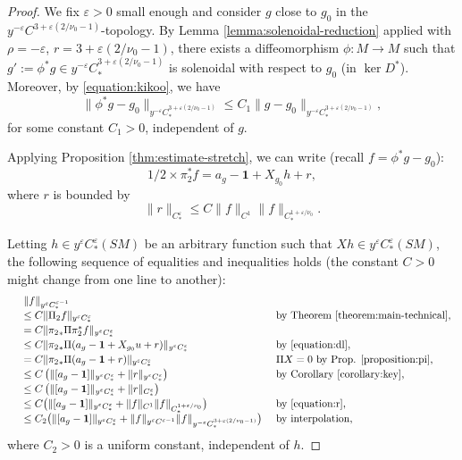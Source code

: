 \documentclass[JEP,XML,SOM,Unicode,NoFloatCountersInSection]{cedram}
\newcommand{\eps}{\varepsilon}
\theoremstyle{plain}
\theoremstyle{definition}
\begin{document}
\begin{proof}
We fix $\eps > 0$ small enough and consider $g$ close to $g_0$ in the $y^{-\eps} C^{3+\eps(2/\nu_0-1)}$-topology. By Lemma \ref{lemma:solenoidal-reduction} applied with $\rho=-\eps$, $r = 3+\eps(2/\nu_0-1)$, there exists a diffeomorphism $\phi : M \to M$ such that $g' := \phi^*g \in y^{-\eps} C^{3+\eps(2/\nu_0-1)}_*$ is solenoidal with respect to $g_0$ (\ie in $\ker D^*$). Moreover, by \eqref{equation:kikoo}, we have
\begin{equation}
\label{equation:boom}
\|\phi^*g-g_0\|_{y^{-\eps} C^{3+\eps(2/\nu_0-1)}_*} \leq C_1 \|g-g_0\|_{y^{-\eps} C^{3+\eps(2/\nu_0-1)}_*},
\end{equation}
for some constant $C_1 > 0$, independent of $g$.

Applying Proposition \ref{thm:estimate-stretch}, we can write (recall $f = \phi^*g-g_0$):
\begin{equation}
\label{equation:dl}
1/2 \times \pi_2^*f = a_{g} - \mathbf{1} + X_{g_0}h + r,
\end{equation}
where $r$ is bounded by
\begin{equation}
\label{equation:r}
\|r\|_{C^\eps_*} \leq C\| f \|_{C^{1}} \| f \|_{C^{1+\eps/\nu_0}_*}.
\end{equation}

Letting $h \in y^\eps C^\eps_*(SM)$ be an arbitrary function such that $Xh \in y^\eps C^\eps_*(SM)$, the following sequence of equalities and inequalities holds (the constant $C >0$ might change from one line to another):
\begin{equation}
\label{equation:long}
\begin{array}{lll}
& \|f\|_{y^\eps C^{\eps-1}_*} \\[2pt]
& \leq C \|\Pi_2f\|_{y^\eps C^{\eps}_*} & \text{ by Theorem \ref{theorem:main-technical}}, \\[2pt]
& = C\|{\pi_2}_* \Pi \pi_2^*f\|_{y^\eps C^{\eps}_*} & \\[2pt]
& \leq C \|{\pi_2}_* \Pi (a_g - \mathbf{1} + X_{g_0}u + r)\|_{y^\eps C^{\eps}_*} & \text{ by \eqref{equation:dl}}, \\[2pt]
& = C\|{\pi_2}_* \Pi (a_g - \mathbf{1} + r)\|_{y^\eps C^{\eps}_*} & \text{ $\Pi X = 0$ by Prop. \ref{proposition:pi},} \\[2pt]
& \leq C \left( \|[a_g-\mathbf{1}]\|_{y^\eps C^{\eps}_*} + \|r\|_{y^\eps C^{\eps}_*}\right) & \text{ by Corollary \ref{corollary:key}, } \\[2pt]
& \leq C \left( \|[a_g-\mathbf{1}]\|_{y^\eps C^{\eps}_*} + \|r\|_{C^{\eps}_*} \right) & \\[2pt]
& \leq C \bigl(\|[a_g-\mathbf{1}]\|_{y^\eps C^{\eps}_*} + \| f \|_{C^{1}} \| f \|_{C^{1+\eps/\nu_0}_*} \bigr) & \text{ by \eqref{equation:r}, } \\[2pt]
& \leq C_2 \bigl(\|[a_g-\mathbf{1}]\|_{y^\eps C^{\eps}_*} + \| f \|_{y^\eps C^{\eps-1}} \| f \|_{y^{-\eps} C^{3+\eps(2/\nu_0-1)}_*} \bigr) & \text{ by interpolation,}
\end{array}
\end{equation}
where $C_2 > 0$ is a uniform constant, independent of $h$.


\end{proof}
\end{document}
